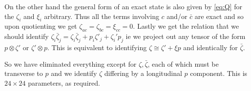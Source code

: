 \documentclass[11pt, class=article, crop=false]{standalone}
\begin{document}
\begin{enumerate}
	  On the other hand the general form of an exact state is also given by \eqref{eq:Q} for the $\zeta_i$ and $\xi_i$ arbitrary. Thus all the terms involving $c$ and/or $\bar c$ are exact and so upon quotienting we get $\zeta_{ac} = \zeta_{bc} = \xi_{cc} = 0$. Lastly we get the relation that we should identify $\zeta_i \bar \zeta_j = \zeta_i \bar \zeta_j + p_i \zeta'_j + \zeta_i' p_j $
	 ie we project out any tensor of the form $p \otimes \zeta'$ or $\zeta' \otimes p$. This is equivalent to identifying $\zeta \cong \zeta' + \xi p$ and identically for $\bar \zeta$. 
	 
	 So we have eliminated everything except for $\zeta, \bar \zeta$, each of which must be transverse to $p$ and we identify $\zeta$ differing by a longitudinal $p$ component. This is $24 \times 24$ parameters, as required.  
	  

	  

\end{enumerate}
\end{document}
